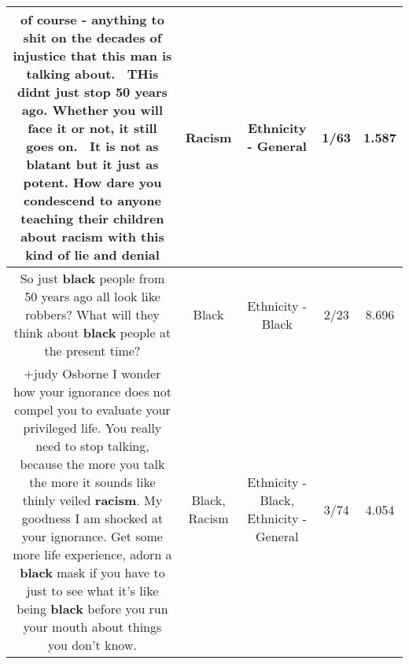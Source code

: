 \documentclass[11pt]{article}
\newlength\mylength
\begin{document}
\begin{center}
\begin{longtable}{|C{.65\mylength}|C{.30\mylength}|C{.12\mylength}|C{.12\mylength}|C{.12\mylength}|}
  \small of course - anything to shit on the decades of injustice that this man is talking about.  THis didnt just stop 50 years ago. Whether you will face it or not, it still goes on.  It is not as blatant but it just as potent. How dare you condescend to anyone teaching their children about \textbf{racism} with this kind of lie and denial\normalsize   & Racism & Ethnicity - General & 1/63 & 1.587 \\  \hline
  \small So just \textbf{black} people from 50 years ago all look like robbers? What will they think about \textbf{black} people at the present time?\normalsize   & Black & Ethnicity - Black & 2/23 & 8.696 \\  \hline
  \small +judy Osborne I wonder how your ignorance does not compel you to evaluate your privileged life. You really need to stop talking, because the more you talk the more it sounds like thinly veiled \textbf{racism}. My goodness I am shocked at your ignorance. Get some more life experience, adorn a \textbf{black} mask if you have to just to see what it's like being \textbf{black} before you run your mouth about things you don't know.\normalsize   & Black, Racism & Ethnicity - Black, Ethnicity - General & 3/74 & 4.054 \\  \hline

\end{longtable}
\end{center}
\end{document}
